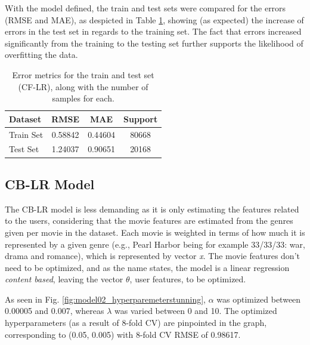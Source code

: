 \documentclass[conference]{IEEEtran}
\begin{document}
With the model defined, the train and test sets were compared for the errors (RMSE and MAE), as despicted in Table \ref{tab:model01_results}, showing (as expected) the increase of errors in the test set in regards to the training set. The fact that errors increased significantly from the training to the testing set further supports the likelihood of overfitting the data.


\begin{table}[H]
\centering
\caption{Error metrics for the train and test set (CF-LR), along with the number of samples for each.}
\label{tab:model01_results}
\begin{tabular}{lccc}
\toprule
\textbf{Dataset} & \textbf{RMSE} & \textbf{MAE} & \textbf{Support} \\
\midrule
Train Set & 0.58842 & 0.44604 & 80668 \\
Test Set & 1.24037 & 0.90651 & 20168 \\
\bottomrule
\end{tabular}
\end{table}

\subsection{CB-LR Model}

The CB-LR model is less demanding as it is only estimating the features related to the users, considering that the movie features are estimated from the genres given per movie in the dataset. Each movie is weighted in terms of how much it is represented by a given genre (e.g., Pearl Harbor being for example 33/33/33: war, drama and romance), which is represented by vector \textit{x}. The movie features don't need to be optimized, and as the name states, the model is a linear regression \textit{content based}, leaving the vector \textit{$\theta$}, user features, to be optimized. 

As seen in Fig. \ref{fig:model02_hyperparemeterstunning}, $\alpha$ was optimized between 0.00005 and 0.007, whereas $\lambda$ was varied between 0 and 10. The optimized hyperparameters (as a result of 8-fold CV) are pinpointed in the graph, corresponding to (0.05, 0.005) with 8-fold CV RMSE of 0.98617.
\end{document}
